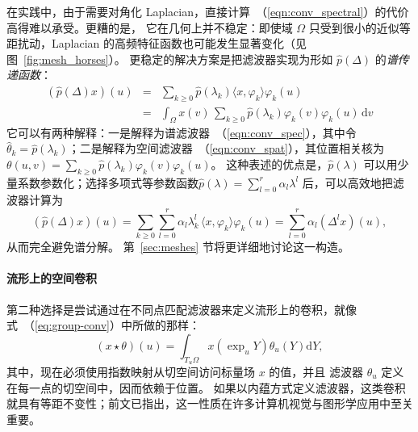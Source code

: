 %
在实践中，由于需要对角化 Laplacian，直接计算~（\ref{eqn:conv_spectral}）的代价高得难以承受。更糟的是，
它在几何上并不稳定：即使域 $\Omega$ 只受到很小的近似等距扰动，Laplacian 的高频特征函数也可能发生显著变化（见图~\ref{fig:mesh_horses}）。
%
%
更稳定的解决方案是把滤波器实现为形如 $\hat{p}(\Delta)$ 的{\em 谱传递函数}：
\begin{eqnarray}
(\hat{p}(\Delta) x)(u) &=& \sum_{k\geq 0} \hat{p}(\lambda_k) \langle x, \varphi_k\rangle \varphi_k (u) \label{eqn:conv_spec} \\
%
&=& \int_\Omega x(v) \, \sum_{k\geq 0} \hat{p}(\lambda_k) \varphi_k(v) \varphi_k (u) \, \mathrm{d}v \label{eqn:conv_spat}
\end{eqnarray}
%
它可以有两种解释：一是解释为谱滤波器~（\ref{eqn:conv_spec}），其中令 $\hat{\theta}_k = \hat{p}(\lambda_k)$；二是解释为空间滤波器~（\ref{eqn:conv_spat}），其位置相关核为 $\theta(u,v) = \sum_{k\geq 0} \hat{p}(\lambda_k) \varphi_k(v) \varphi_k (u)$。
%
%
这种表述的优点是，$\hat{p}(\lambda)$ 可以用少量系数参数化；选择多项式等参数函数$\hat{p}(\lambda) = \sum_{l=0}^r \alpha_l \lambda^l$ 后，可以高效地把滤波器计算为
$$
(\hat{p}(\Delta) x)(u) = \sum_{k\geq 0} \sum_{l= 0}^r \alpha_l \lambda_k^l \, \langle x, \varphi_k\rangle \varphi_k (u) = \sum_{l= 0}^r \alpha_l (\Delta^l x)(u),
$$
从而完全避免谱分解。
%
第~\ref{sec:meshes} 节将更详细地讨论这一构造。





\paragraph{流形上的空间卷积}

第二种选择是尝试通过在不同点匹配滤波器来定义流形上的卷积，就像式~（\ref{eq:group-conv}）中所做的那样：
%
\begin{equation}
(x \star \theta)(u) = \int_{T_u \Omega} x(\exp_u Y) \theta_u(Y) \mathrm{d}Y, 
\label{eq:conv_tangent_space}
\end{equation}
%
其中，现在必须使用指数映射从切空间访问标量场 $x$ 的值，并且
滤波器 $\theta_u$ 定义在每一点的切空间中，因而依赖于位置。%
如果以内蕴方式定义滤波器，这类卷积就具有等距不变性；前文已指出，这一性质在许多计算机视觉与图形学应用中至关重要。


